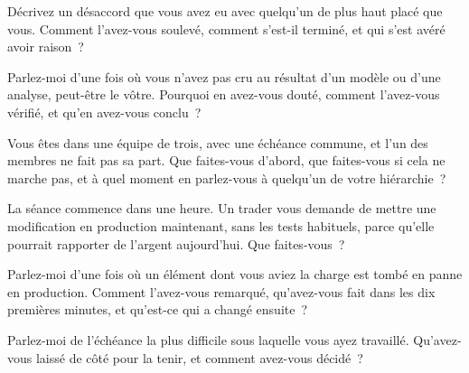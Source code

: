 \begin{question}\label{iq:iv2:behavioural-and-fit:18}
Décrivez un désaccord que vous avez eu avec quelqu'un de plus haut placé que vous. Comment l'avez-vous soulevé, comment s'est-il terminé, et qui s'est avéré avoir raison~?
\end{question}

\begin{question}\label{iq:iv2:behavioural-and-fit:19}
Parlez-moi d'une fois où vous n'avez pas cru au résultat d'un modèle ou d'une analyse, peut-être le vôtre. Pourquoi en avez-vous douté, comment l'avez-vous vérifié, et qu'en avez-vous conclu~?
\end{question}

\begin{question}\label{iq:iv2:behavioural-and-fit:20}
Vous êtes dans une équipe de trois, avec une échéance commune, et l'un des membres ne fait pas sa part. Que faites-vous d'abord, que faites-vous si cela ne marche pas, et à quel moment en parlez-vous à quelqu'un de votre hiérarchie~?
\end{question}

\begin{question}\label{iq:iv2:behavioural-and-fit:21}
La séance commence dans une heure. Un trader vous demande de mettre une modification en production maintenant, sans les tests habituels, parce qu'elle pourrait rapporter de l'argent aujourd'hui. Que faites-vous~?
\end{question}

\begin{question}\label{iq:iv2:behavioural-and-fit:22}
Parlez-moi d'une fois où un élément dont vous aviez la charge est tombé en panne en production. Comment l'avez-vous remarqué, qu'avez-vous fait dans les dix premières minutes, et qu'est-ce qui a changé ensuite~?
\end{question}

\begin{question}\label{iq:iv2:behavioural-and-fit:23}
Parlez-moi de l'échéance la plus difficile sous laquelle vous ayez travaillé. Qu'avez-vous laissé de côté pour la tenir, et comment avez-vous décidé~?
\end{question}

